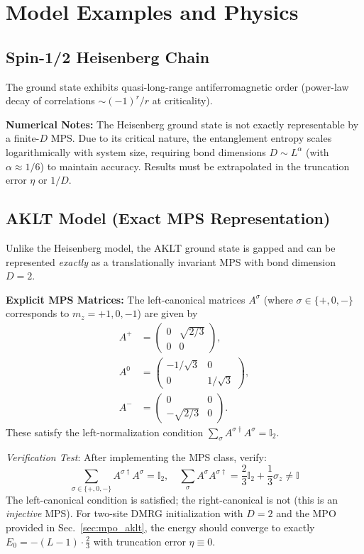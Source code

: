 \documentclass[aps,prb,onecolumn,scriptaddress]{revtex4-2}
\begin{document}
	\section{Model Examples and Physics}
	
	\subsection{Spin-1/2 Heisenberg Chain}
	The ground state exhibits quasi-long-range antiferromagnetic order (power-law decay of correlations $\sim (-1)^r/r$ at criticality). 
	
	\textbf{Numerical Notes:} The Heisenberg ground state is not exactly representable by a finite-$D$ MPS. Due to its critical nature, the entanglement entropy scales logarithmically with system size, requiring bond dimensions $D \sim L^{\alpha}$ (with $\alpha \approx 1/6$) to maintain accuracy. Results must be extrapolated in the truncation error $\eta$ or $1/D$.
	
	\subsection{AKLT Model (Exact MPS Representation)}
	Unlike the Heisenberg model, the AKLT ground state is gapped and can be represented \textit{exactly} as a translationally invariant MPS with bond dimension $D=2$.
	
	\textbf{Explicit MPS Matrices:} The left-canonical matrices $A^{\sigma}$ (where $\sigma \in \{+,0,-\}$ corresponds to $m_z = +1, 0, -1$) are given by
	\begin{align}
		A^{+} &= \begin{pmatrix} 0 & \sqrt{2/3} \\ 0 & 0 \end{pmatrix}, \\
		A^{0} &= \begin{pmatrix} -1/\sqrt{3} & 0 \\ 0 & 1/\sqrt{3} \end{pmatrix}, \\
		A^{-} &= \begin{pmatrix} 0 & 0 \\ -\sqrt{2/3} & 0 \end{pmatrix}.
	\end{align}
	These satisfy the left-normalization condition $\sum_{\sigma} A^{\sigma\dagger} A^{\sigma} = \mathbb{I}_2$.
	
	\textit{Verification Test}: After implementing the MPS class, verify:
	\begin{equation}
		\sum_{\sigma \in \{+,0,-\}} A^{\sigma\dagger} A^{\sigma} = \mathbb{I}_2, \quad 
		\sum_{\sigma} A^{\sigma} A^{\sigma\dagger} = \frac{2}{3}\mathbb{I}_2 + \frac{1}{3}\sigma_z \neq \mathbb{I}
	\end{equation}
	The left-canonical condition is satisfied; the right-canonical is not (this is an \textit{injective} MPS). For two-site DMRG initialization with $D=2$ and the MPO provided in Sec.~\ref{sec:mpo_aklt}, the energy should converge to exactly $E_0 = -(L-1)\cdot \frac{2}{3}$ with truncation error $\eta \equiv 0$.
	
\end{document}
